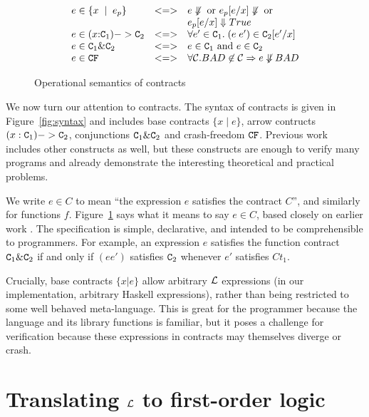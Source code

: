 \begin{figure}
\[\begin{array}{lcl}
e \in \{ x\;\mid\;e_p\} & <=> &  e \not\Downarrow \mbox{ or } e_p[e/x] \not\Downarrow \mbox{ or} \\ 
                        &     &  e_p[e/x] \Downarrow True \\
e \in (x{:}{\tt C}_1) -> {\tt C}_2 & <=> & 
                        \forall e' \in {\tt C}_1.\; (e\;e') \in {\tt C}_2[e'/x] \\
e \in {\tt C}_1 \& {\tt C}_2 & <=> & e \in {\tt C}_1 \mbox{ and } e \in {\tt C}_2 \\
e \in {\tt CF}            & <=> & \forall {\cal C}. BAD \not\in {\cal C} \Rightarrow e \not\Downarrow BAD
\end{array} 
\]
\caption{Operational semantics of contracts} \label{f:contract-spec-op}
\end{figure}

We now turn our attention to contracts. The syntax of contracts
is given in Figure~\ref{fig:syntax} and includes base contracts
$\{ x \mid e \}$, arrow contructs $(x : {\tt C}_1) -> {\tt C}_2$, conjunctions
${\tt C}_1 \& {\tt C}_2$ and crash-freedom ${\tt CF}$. Previous work~\cite{xu+:contracts} 
includes other constructs as well, but these constructs are enough to verify 
many programs and already demonstrate the interesting theoretical and practical problems.

We write $e \in C$ to mean ``the expression $e$ satisfies the contract $C$'', and similarly
for functions $f$.
Figure~\ref{f:contract-spec-op} says what it means to say $e \in C$,
based closely on earlier work \cite{xu}.  The specification is
simple, declarative, and intended to be comprehensible to programmers.
For example, an expression $e$ satisfies the function contract ${\tt C}_1 \& {\tt C}_2$ if and 
only if $(e e')$ satisfies ${\tt C}_2$ whenever $e'$ satisfies $Ct_1$.

Crucially, base contracts $\{x|e\}$ allow arbitrary $\cal L$
expressions (in our implementation, arbitrary Haskell expressions),
rather than being restricted to some well behaved meta-language.  This
is great for the programmer because the language and its library
functions is familiar, but it poses a challenge for verification
because these expressions in contracts may themselves diverge or
crash.

\section{Translating $\cal L$ to first-order logic} \label{ssect:denot-fol}

